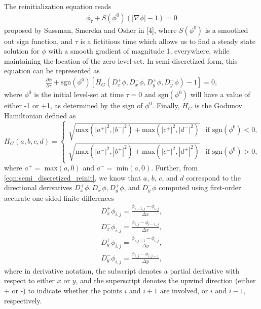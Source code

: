 \documentclass[oneside,12pt,final]{/Applications/TeX/packages/ucthesis-CA2012}
\begin{document}
\begin{mainmatter}
The reinitialization equation reads
\begin{equation}  
\begin{aligned}
\phi_\tau + S(\phi^0)(|\nabla \phi|-1) = 0
\end{aligned}
\end{equation}
proposed by Sussman, Smereka and Osher in [4], where $S(\phi^0)$ is a smoothed out sign function, and $\tau$ is a fictitious time which allows us to find a steady state solution for $\phi$ with a smooth gradient of magnitude 1, everywhere, while maintaining the location of the zero level-set. In semi-discretized form, this equation can be represented as
\begin{equation} \label{eqn:semi_discretized_reinit}  
\begin{aligned}
\frac{\partial \phi}{\partial \tau} + \text{sgn}(\phi ^0)[H_G(D_x^+ \phi,D_x^- \phi,D_y^+ \phi,D_y^- \phi)-1] = 0,
\end{aligned}
\end{equation}
where $\phi^0$ is the initial level-set at time $\tau = 0$ and sgn$(\phi^0)$ will have a value of either -1 or +1, as determined by the sign of $\phi^0$. Finally, $H_G$ is the Godunov Hamiltonian defined as
\begin{equation}  
    H_G(a,b,c,d) = 
\begin{cases}
    \sqrt{\text{max}(|a^+|^2,|b^-|^2) + \text{max}(|c^+|^2,|d^-|^2)}& \text{if sgn}(\phi^0) < 0,  \\  \sqrt{\text{max}(|a^-|^2,|b^+|^2) + \text{max}(|c^-|^2,|d^+|^2)} & \text{if sgn}(\phi^0) > 0,
\end{cases}
\end{equation}
where $a^+ =$ max$(a,0)$ and $a^- =$ min$(a,0)$. Further, from \eqref{eqn:semi_discretized_reinit}, we know that $a$, $b$, $c$, and $d$ correspond to the directional derivatives $D_x^+ \phi,D_x^- \phi,D_y^+ \phi$, and $D_y^- \phi$ computed using first-order accurate one-sided finite differences
\begin{equation} \label{eqn:directional_derivatives}
\begin{aligned}
D_x^+ \phi_{i,j} = \frac{\phi_{i+1,j}-\phi_{i,j}}{\Delta x},\\
D_x^- \phi_{i,j} = \frac{\phi_{i,j}-\phi_{i-1,j}}{\Delta x},\\
D_y^+ \phi_{i,j} = \frac{\phi_{i,j+1}-\phi_{i,j}}{\Delta y},\\
D_y^- \phi_{i,j} = \frac{\phi_{i,j}-\phi_{i,j-1}}{\Delta y},
\end{aligned}
\end{equation}
where in derivative notation, the subscript denotes a partial derivative with respect to either $x$ or $y$, and the superscript denotes the upwind direction (either + or -) to indicate whether the points $i$ and $i+1$ are involved, or $i$ and $i-1$, respectively.


\end{mainmatter}
\end{document}
